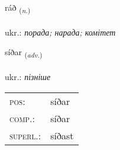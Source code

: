 \documentclass[frontgrid, backgrid]{flacards}\usepackage[]{graphicx}\usepackage[]{xcolor}
\begin{document}
\renewcommand{\blhead}{\vskip5pt {\small\bfseries\footnotesize Nafnorð | іменник }}
\renewcommand{\bcfoot}{\vskip5pt \hspace{2pt}{\small\bfseries\footnotesize 1K}}


{ráð \small{\textsubscript{(\textit{n.})}} \\[1ex] %
\textphonetic{[rauːð]} \\
ukr.: \emph{порада; нарада; комітет} \\  [2ex]
\renewcommand*{\arraystretch}{0.8}
}

\renewcommand{\flhead}{\vskip5pt \fboxsep=0pt {\small\bfseries\footnotesize Atviksorð | прислівник}}
\renewcommand{\fcfoot}{\vskip5pt \fboxsep=0pt \hspace{2pt}{\small\bfseries\footnotesize 1K}}

\renewcommand{\blhead}{\vskip5pt {\small\bfseries\footnotesize Atviksorð | прислівник }}
\renewcommand{\bcfoot}{\vskip5pt \hspace{2pt}{\small\bfseries\footnotesize 1K}}


{síðar \small{\textsubscript{(\textit{adv.})}} \\[1ex] %
\textphonetic{[siːðar]} \\
ukr.: \emph{пізніше} \\  [2ex]
\renewcommand*{\arraystretch}{0.8}
\begin{tabular}{ll}
\textsc{pos}: & síðar \\ 
\textsc{comp.}: & síðar \\ 
\textsc{superl.}: & síðast \\
\end{tabular}
}

\renewcommand{\flhead}{\vskip5pt \fboxsep=0pt {\small\bfseries\footnotesize Sagnorð | дієслово}}
\renewcommand{\fcfoot}{\vskip5pt \fboxsep=0pt \hspace{2pt}{\small\bfseries\footnotesize 1K}}
\end{document}
